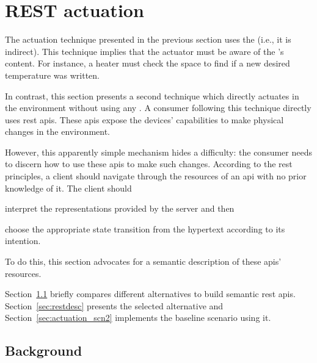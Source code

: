 \section{REST actuation}
\label{sec:direct_actuation}


The actuation technique presented in the previous section uses the \Space{} (i.e., it is indirect).
This technique implies that the actuator must be aware of the \Space{}'s content.
For instance, a heater must check the space to find if a new desired temperature was written.


In contrast, this section presents a second technique which directly actuates in the environment without using any \Space{}.
A consumer following this technique directly uses \ac{rest} \acp{api}. %
These \acp{api} expose the devices' capabilities to make physical changes in the environment.

However, this apparently simple mechanism hides a difficulty: the consumer needs to discern how to use these \acp{api} to make such changes.
According to the \ac{rest} principles, a client should navigate through the resources of an \ac{api} with no prior knowledge of it.
The client should 
\begin{enumerate*}[label=\itshape(\arabic*\upshape)]
  \item interpret the representations provided by the server and then
  \item choose the appropriate state transition from the hypertext according to its intention. %
\end{enumerate*}
To do this, this section advocates for a semantic description of these \acp{api}' resources.

Section~\ref{sec:actuation_rest_background} briefly compares different alternatives to build semantic \ac{rest} \acp{api}.
Section~\ref{sec:restdesc} presents the selected alternative and Section~\ref{sec:actuation_scn2} implements the baseline scenario using it.



\subsection{Background}
\label{sec:actuation_rest_background}

